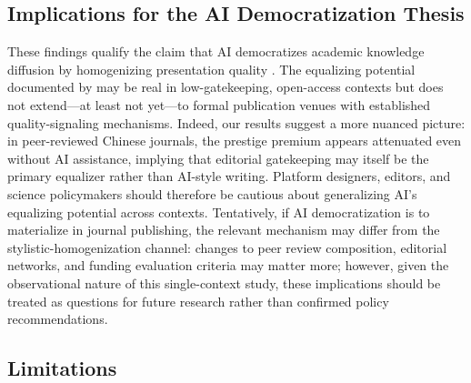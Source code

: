 \documentclass[12pt,a4paper]{article}
\begin{document}
\subsection{Implications for the AI Democratization Thesis}

These findings qualify the claim that AI democratizes academic
knowledge diffusion by homogenizing presentation quality
\citep{Liang2024}.
The equalizing potential documented by \citet{JoLi2026} may be
real in low-gatekeeping, open-access contexts but does not extend---at
least not yet---to formal publication venues with established
quality-signaling mechanisms.
Indeed, our results suggest a more nuanced picture: in peer-reviewed
Chinese journals, the prestige premium appears attenuated even without
AI assistance, implying that editorial gatekeeping may itself be the
primary equalizer rather than AI-style writing.
Platform designers, editors, and science policymakers should therefore
be cautious about generalizing AI's equalizing potential across
contexts.
Tentatively, if AI democratization is to materialize in journal publishing,
the relevant mechanism may differ from the stylistic-homogenization
channel: changes to peer review composition, editorial networks, and
funding evaluation criteria may matter more; however, given the
observational nature of this single-context study, these implications
should be treated as questions for future research rather than
confirmed policy recommendations.

\subsection{Limitations}
\end{document}
